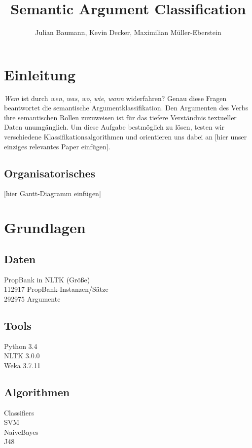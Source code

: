 \documentclass[runningheads]{llncs}
\begin{document}
\lstset{language=Python}

\title{Semantic Argument Classification}

\author{Julian Baumann, Kevin Decker, Maximilian M\"uller-Eberstein}


\maketitle

\section{Einleitung}
\textit{Wem} ist durch \textit{wen}, \textit{was}, \textit{wo}, \textit{wie}, \textit{wann} widerfahren? Genau diese Fragen beantwortet die semantische Argumentklassifikation. Den Argumenten des Verbs ihre semantischen Rollen zuzuweisen ist f\"ur das tiefere Verst\"andnis textueller Daten unumg\"anglich. Um diese Aufgabe bestm\"oglich zu l\"osen, testen wir verschiedene Klassifikationsalgorithmen und orientieren uns dabei an [hier unser einziges relevantes Paper einf\"ugen].
\subsection{Organisatorisches}
[hier Gantt-Diagramm einf\"ugen]

\section{Grundlagen}
\subsection{Daten}
PropBank in NLTK (Gr\"o\ss{}e)\\
112917 PropBank-Instanzen/S\"atze\\
292975 Argumente
\subsection{Tools}
Python 3.4\\
NLTK 3.0.0\\
Weka 3.7.11
\subsection{Algorithmen}
Classifiers\\
SVM\\
NaiveBayes\\
J48
\end{document}
